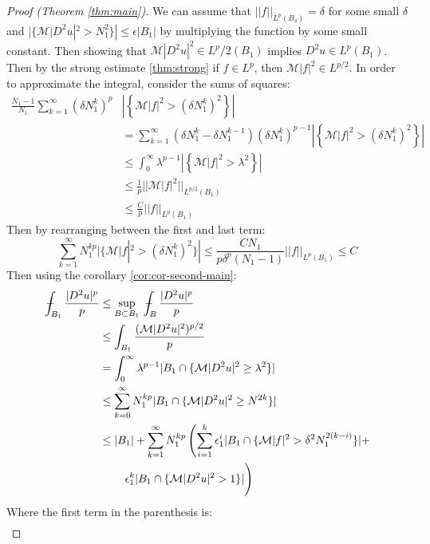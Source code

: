 \documentclass[12pt]{artikel1}
\begin{document}
\begin{proof}[Proof (Theorem \ref{thm:main})]
     We can assume that $||f||_{L^p(B_4)}=\delta$ for some small $\delta$ and $|\{\mathcal{M}|D^2u|^2>N_1^2\}|\leq\epsilon|B_1|$ by multiplying the function by some small constant. Then showing that $\mathcal{M}|D^2u|^2\in L^p/2(B_1)$ implies $D^2u\in L^p(B_1)$. Then by the strong estimate \ref{thm:strong} if $f\in L^p$, then $\mathcal{M}|f|^2\in L^{p/2}$. In order to approximate the integral, consider the sums of squares:
     \begin{align*}
         \frac{N_1-1}{N_1}\sum_{k=1}^\infty(\delta N_1^k)^p&\left|\left\{\mathcal{M}|f|^2>(\delta N_1^k)^2 \right\}\right| \\
         &=\sum_{k=1}^\infty (\delta N_1^k-\delta N_1^{k-1})(\delta N_1^k)^{p-1}\left|\left\{\mathcal{M}|f|^2>(\delta N_1^k)^2 \right\}\right| \\
         &\leq\int_0^\infty\lambda^{p-1}\left|\left\{\mathcal{M}|f|^2>\lambda^2 \right\}\right| \\
         &\leq\frac{1}{p}||\mathcal{M}|f|^2||_{L^{p/2}(B_1)} \\
         &\leq\frac{C}{p}||f||_{L^p(B_1)}
     \end{align*}
     Then by rearranging between the first and last term:
     \begin{equation*}
         \sum_{k=1}^\infty N_1^{kp}|\{\mathcal{M}|f|^2>(\delta N_1^k)^2 \}|\leq\frac{CN_1}{p\delta^p(N_1-1)}||f||_{L^p(B_1)}\leq C
     \end{equation*}
     Then using the corollary \ref{cor:cor-second-main}:
     \begin{align*}
         \intavg_{B_1}\frac{|D^2u|^p}{p}&\leq\sup_{B\subset B_1}\intavg_{B}\frac{|D^2u|^p}{p} \\
         &\leq\int_{B_1}\frac{(\mathcal{M}|D^2u|^2)^{p/2}}{p} \\
         &=\int_0^\infty\lambda^{p-1}|B_1\cap\{\mathcal{M}|D^2u|^2\geq\lambda^2\}| \\
         &\leq\sum_{k=0}^\infty N_1^{kp}|B_1\cap\{\mathcal{M}|D^2u|^2\geq N^{2k}\}| \\
         &\leq|B_1|+\sum_{k=1}^\infty N_1^{kp}\left(\sum_{i=1}^k\epsilon_1^i|B_1\cap\{\mathcal{M}|f|^2>\delta^2 N_1^{2(k-i)}\}|+ \right. \\
         &\qquad\left. \epsilon_1^k|B_1\cap\{\mathcal{M}|D^2u|^2>1\}| \vphantom{\sum_{k=1}^\infty}\right)
     \end{align*}
     Where the first term in the parenthesis is:
     \begin{align*}

\end{align*}
\end{proof}
\end{document}
